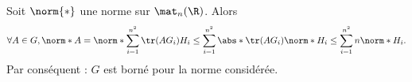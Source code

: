 \begin{enonce}
\begin{solution}
\begin{enumerate}
Soit $\norm{*}$ une norme sur $\mat_n(\R)$. Alors
\begin{equation*}
  \forall A\in G,
  \norm*{A}
  =\norm*{\sum_{i=1}^{n^2}\tr(AG_i) H_i}
  \leq \sum_{i=1}^{n^2} \abs*{\tr(AG_i)}\norm*{H_i}
  \leq\sum_{i=1}^{n^2} n\norm*{H_i}.
\end{equation*}
Par conséquent : $G$ est borné pour la norme considérée.
\end{enumerate}
\end{solution}
\end{enonce}
